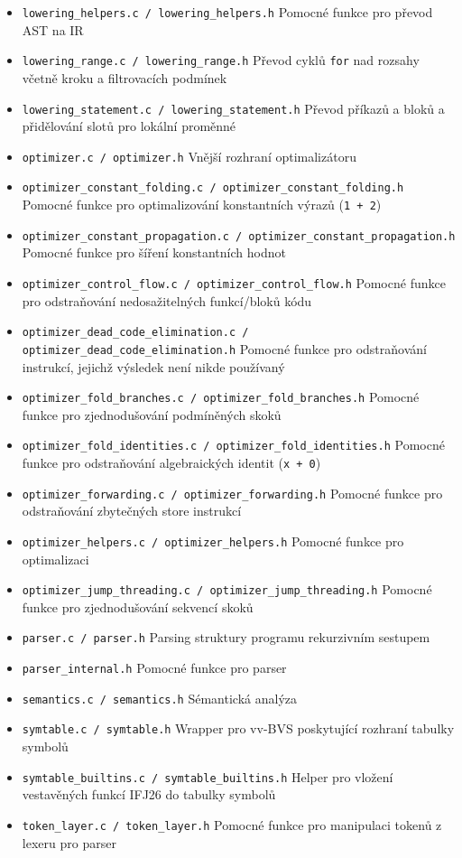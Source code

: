 \documentclass[11pt,a4paper]{article}
\begin{document}
\begin{itemize}
    \item \texttt{lowering\_helpers.c\,/\,lowering\_helpers.h} Pomocné funkce pro převod AST na IR
    \item \texttt{lowering\_range.c\,/\,lowering\_range.h} Převod cyklů \verb|for| nad rozsahy včetně kroku a filtrovacích podmínek
    \item \texttt{lowering\_statement.c\,/\,lowering\_statement.h} Převod příkazů a bloků a přidělování slotů pro lokální proměnné
    \item \texttt{optimizer.c\,/\,optimizer.h} Vnější rozhraní optimalizátoru
    \item \texttt{optimizer\_constant\_folding.c\,/\,optimizer\_constant\_folding.h} Pomocné funkce pro optimalizování konstantních výrazů (\texttt{1 + 2})
    \item \texttt{optimizer\_constant\_propagation.c\,/\,optimizer\_constant\_propagation.h} Pomocné funkce pro šíření konstantních hodnot
    \item \texttt{optimizer\_control\_flow.c\,/\,optimizer\_control\_flow.h} Pomocné funkce pro odstraňování nedosažitelných funkcí/bloků kódu
    \item \texttt{optimizer\_dead\_code\_elimination.c\,/\,optimizer\_dead\_code\_elimination.h} Pomocné funkce pro odstraňování instrukcí, jejichž výsledek není nikde používaný
    \item \texttt{optimizer\_fold\_branches.c\,/\,optimizer\_fold\_branches.h} Pomocné funkce pro zjednodušování podmíněných skoků
    \item \texttt{optimizer\_fold\_identities.c\,/\,optimizer\_fold\_identities.h} Pomocné funkce pro odstraňování algebraických identit (\texttt{x + 0})
    \item \texttt{optimizer\_forwarding.c\,/\,optimizer\_forwarding.h} Pomocné funkce pro odstraňování zbytečných store instrukcí
    \item \texttt{optimizer\_helpers.c\,/\,optimizer\_helpers.h} Pomocné funkce pro optimalizaci
    \item \texttt{optimizer\_jump\_threading.c\,/\,optimizer\_jump\_threading.h} Pomocné funkce pro zjednodušování sekvencí skoků
    \item \texttt{parser.c\,/\,parser.h} Parsing struktury programu rekurzivním sestupem
    \item \texttt{parser\_internal.h} Pomocné funkce pro parser
    \item \texttt{semantics.c\,/\,semantics.h} Sémantická analýza
    \item \texttt{symtable.c\,/\,symtable.h} Wrapper pro vv-BVS poskytující rozhraní tabulky symbolů
    \item \texttt{symtable\_builtins.c\,/\,symtable\_builtins.h} Helper pro vložení vestavěných funkcí IFJ26 do tabulky symbolů
    \item \texttt{token\_layer.c\,/\,token\_layer.h} Pomocné funkce pro manipulaci tokenů z lexeru pro parser
\end{itemize}
\end{document}
